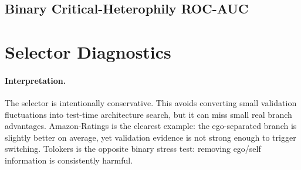 \documentclass[10pt]{article}
\begin{document}
\begin{table}[H]
\centering
\caption{Paired checks against the strongest implemented external non-HARP baseline.}
\resizebox{\textwidth}{!}{%

}
\end{table}

\subsection{Binary Critical-Heterophily ROC-AUC}

\begin{table}[H]
\centering
\caption{Complete binary critical-heterophily branch comparisons under ROC-AUC.}

\end{table}

\begin{table}[H]
\centering
\caption{Robust binary critical-heterophily branch checks under ROC-AUC.}

\end{table}

\section{Selector Diagnostics}

\begin{table}[H]
\centering
\caption{Threshold sensitivity for the validation-calibrated selector.}

\end{table}

\begin{table}[H]
\centering
\caption{CPU training cost for two-expert routing.}

\end{table}

\paragraph{Interpretation.}
The selector is intentionally conservative.  This avoids converting small
validation fluctuations into test-time architecture search, but it can miss
small real branch advantages.  Amazon-Ratings is the clearest example: the
ego-separated branch is slightly better on average, yet validation evidence is
not strong enough to trigger switching.  Tolokers is the opposite binary
stress test: removing ego/self information is consistently harmful.
\end{document}
